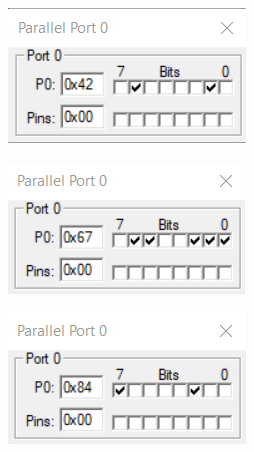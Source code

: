 \documentclass{lab_sheet}
\begin{document}
\begin{figure}[H]\ContinuedFloat
\begin{subfigure}{.5\textwidth}
  \centering
    \includegraphics[frame,width=.8\linewidth]{../Figures/1_6_c.png}  
  \label{fig:prob6a-c}
  \caption{}
\end{subfigure}
\begin{subfigure}{.5\textwidth}
  \centering
  \includegraphics[frame,width=.8\linewidth]{../Figures/1_6_d.png}   
  \caption{}
  \label{fig:prob6a-d}
\end{subfigure}
\begin{subfigure}{.5\textwidth}
  \centering
  \includegraphics[frame,width=.8\linewidth]{../Figures/1_6_e.png}  
  \label{fig:prob6a-e}
  \caption{}
\end{subfigure}
\begin{subfigure}{.5\textwidth}

\end{subfigure}
\end{figure}
\end{document}
